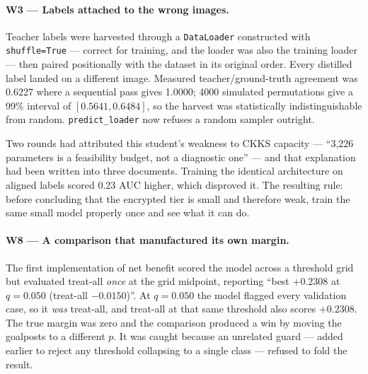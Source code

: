 \documentclass[11pt,a4paper]{article}
\begin{document}
\paragraph{W3 --- Labels attached to the wrong images.}
Teacher labels were harvested through a \texttt{DataLoader} constructed with \texttt{shuffle=True} ---
correct for training, and the loader was also the training loader --- then paired positionally with
the dataset in its original order. Every distilled label landed on a different image. Measured
teacher/ground-truth agreement was 0.6227 where a sequential pass gives 1.0000; 4000 simulated
permutations give a 99\% interval of $[0.5641, 0.6484]$, so the harvest was statistically
indistinguishable from random. \texttt{predict\_loader} now refuses a random sampler outright.

Two rounds had attributed this student's weakness to CKKS capacity --- ``3{,}226 parameters is a
feasibility budget, not a diagnostic one'' --- and that explanation had been written into three
documents. Training the identical architecture on aligned labels scored 0.23 AUC higher, which
disproved it. The resulting rule: before concluding that the encrypted tier is small and therefore
weak, train the same small model properly once and see what it can do.

\paragraph{W8 --- A comparison that manufactured its own margin.}
The first implementation of net benefit scored the model across a threshold grid but evaluated
treat-all \emph{once} at the grid midpoint, reporting ``best $+0.2308$ at $q=0.050$ (treat-all
$-0.0150$)''. At $q=0.050$ the model flagged every validation case, so it \emph{was} treat-all, and
treat-all at that same threshold also scores $+0.2308$. The true margin was zero and the comparison
produced a win by moving the goalposts to a different $p$. It was caught because an unrelated guard
--- added earlier to reject any threshold collapsing to a single class --- refused to fold the
result.
\end{document}
